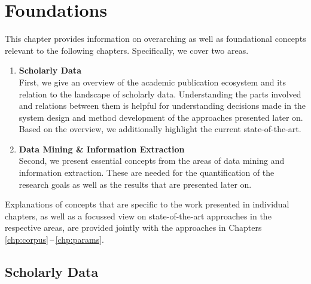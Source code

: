\chapter{Foundations}
\label{chp:foundations}

This chapter provides information on overarching as well as foundational concepts relevant to the following chapters. Specifically, we cover two areas.

\begin{enumerate}
    \item \textbf{Scholarly Data}\\
        First, we give an overview of the academic publication ecosystem and its relation to the landscape of scholarly data. Understanding the parts involved and relations between them is helpful for understanding decisions made in the system design and method development of the approaches presented later on. Based on the overview, we additionally highlight the current state-of-the-art.
    \item \textbf{Data Mining \& Information Extraction}\\
        Second, we present essential concepts from the areas of data mining and information extraction. These are needed for the quantification of the research goals as well as the results that are presented later on.
\end{enumerate}

Explanations of concepts that are specific to the work presented in individual chapters, as well as a focussed view on state-of-the-art approaches in the respective areas, are provided jointly with the approaches in Chapters \ref{chp:corpus}\,--\,\ref{chp:params}.

\section{Scholarly Data}




